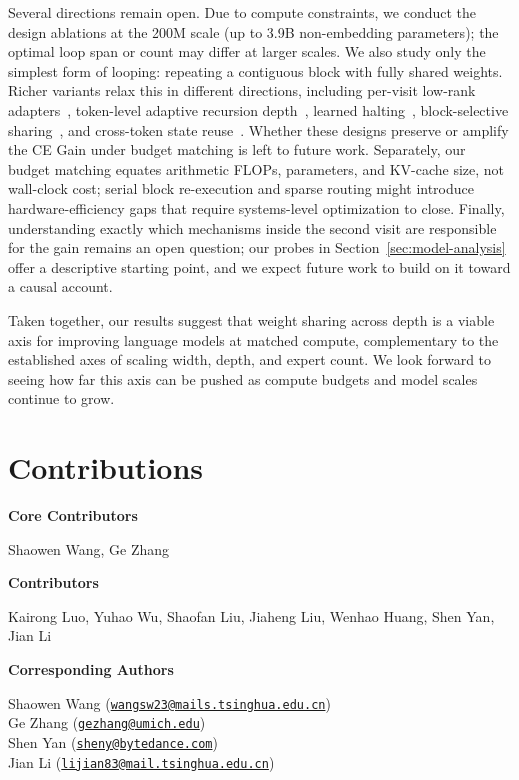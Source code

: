 \documentclass[]{bytedance_seed}
\theoremstyle{definition}
\theoremstyle{remark}
\begin{document}
%
Several directions remain open.
Due to compute constraints, we conduct the design ablations at the 200M scale (up to 3.9B non-embedding parameters); the optimal loop span or count may differ at larger scales.
%
%
We also study only the simplest form of looping: repeating a contiguous block with fully shared weights.
Richer variants relax this in different directions, including per-visit low-rank adapters~\cite{bae2025relaxed}, token-level adaptive recursion depth~\cite{bae2025mixture}, learned halting~\cite{dehghani2019universal,elbayad2020depth}, block-selective sharing~\cite{kapl2026growing}, and cross-token state reuse~\cite{cai2026t2mlr}.
Whether these designs preserve or amplify the CE Gain under budget matching is left to future work.
%
Separately, our budget matching equates arithmetic FLOPs, parameters, and KV-cache size, not wall-clock cost; serial block re-execution and sparse routing might introduce hardware-efficiency gaps that require systems-level optimization to close.
%
Finally, understanding exactly which mechanisms inside the second visit are responsible for the gain remains an open question; our probes in Section~\ref{sec:model-analysis} offer a descriptive starting point, and we expect future work to build on it toward a causal account.

%
Taken together, our results suggest that weight sharing across depth is a viable axis for improving language models at matched compute, complementary to the established axes of scaling width, depth, and expert count.
We look forward to seeing how far this axis can be pushed as compute budgets and model scales continue to grow.
 \section{Contributions}
%
\textbf{Core Contributors}

Shaowen Wang, Ge Zhang

\textbf{Contributors}

Kairong Luo, Yuhao Wu, Shaofan Liu, Jiaheng Liu, Wenhao Huang, Shen Yan, Jian Li

\textbf{Corresponding Authors}

Shaowen Wang (\href{mailto:wangsw23@mails.tsinghua.edu.cn}{\texttt{wangsw23@mails.tsinghua.edu.cn}})\\
Ge Zhang (\href{mailto:gezhang@umich.edu}{\texttt{gezhang@umich.edu}})\\
Shen Yan (\href{mailto:sheny@bytedance.com}{\texttt{sheny@bytedance.com}})\\
Jian Li (\href{mailto:lijian83@mail.tsinghua.edu.cn}{\texttt{lijian83@mail.tsinghua.edu.cn}})
\end{document}
